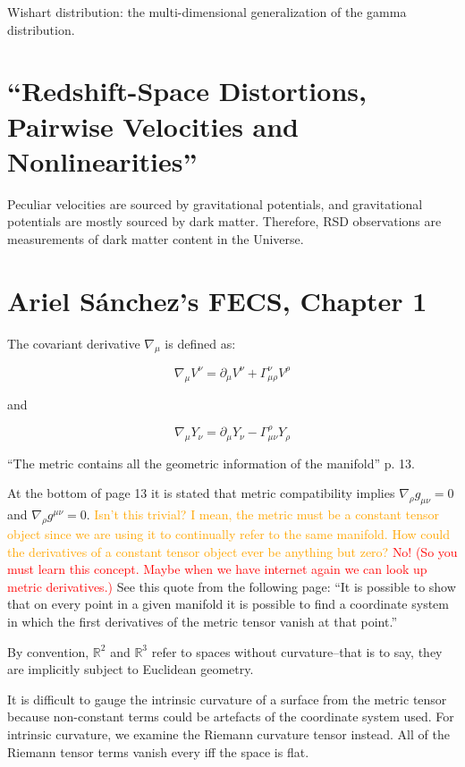 \documentclass[11pt]{article}
\begin{document}
Wishart distribution: the multi-dimensional generalization of the gamma
distribution.

\section{``Redshift-Space Distortions, Pairwise Velocities and
Nonlinearities''}

Peculiar velocities are sourced by gravitational potentials, and gravitational
potentials are mostly sourced by dark matter. Therefore, RSD observations are
measurements of dark matter content in the Universe.

\section{Ariel S\'{a}nchez's FECS, Chapter 1}

The covariant derivative $\nabla_\mu$ is defined as:

\begin{equation}
	\nabla_\mu V^\nu = \partial_\mu V^\nu + \Gamma^\nu_{\mu \rho} V^\rho
\end{equation}

and

\begin{equation}
	\nabla_\mu Y_\nu = \partial_\mu Y_\nu - \Gamma^\rho_{\mu \nu} Y_\rho
\end{equation}

``The metric contains all the geometric information of the manifold'' p. 13.

At the bottom of page 13 it is stated that metric compatibility implies
$\nabla_\rho g_{\mu \nu} = 0$ and $\nabla_\rho  g^{\mu \nu} = 0$.
\textcolor{orange}{Isn't this trivial? I mean, the metric must be a constant
tensor object since we are using it to continually refer to the same manifold.
How could the derivatives of a constant tensor object ever be anything but
zero?} \textcolor{red}{No! (So you must learn this concept. Maybe when we have
internet again we can look up metric derivatives.)} See this quote from the
following page: ``It is possible to show that on every point in a given
manifold it is possible to find a coordinate system in which the first
derivatives of the metric tensor vanish at that point.''

By convention, $\mathbb{R}^2$ and $\mathbb{R}^3$ refer to spaces without
curvature--that is to say, they are implicitly subject to Euclidean geometry.

It is difficult to gauge the intrinsic curvature of a surface from the metric
tensor because non-constant terms could be artefacts of the coordinate system
used. For intrinsic curvature, we examine the Riemann curvature tensor instead.
All of the Riemann tensor terms vanish every iff the space is flat.
\end{document}
